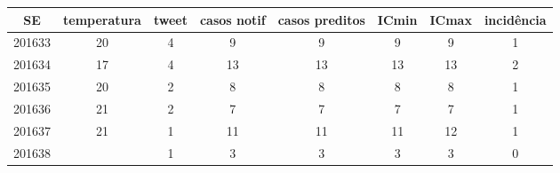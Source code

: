 \begin{tabular}{c|ccccccc}
  \hline
SE & temperatura & tweet & casos notif & casos preditos & ICmin & ICmax & incidência \\ 
  \hline
201633 & 20 & 4 & 9 & 9 & 9 & 9 & 1 \\ 
  201634 & 17 & 4 & 13 & 13 & 13 & 13 & 2 \\ 
  201635 & 20 & 2 & 8 & 8 & 8 & 8 & 1 \\ 
  201636 & 21 & 2 & 7 & 7 & 7 & 7 & 1 \\ 
  201637 & 21 & 1 & 11 & 11 & 11 & 12 & 1 \\ 
  201638 &  & 1 & 3 & 3 & 3 & 3 & 0 \\ 
   \hline
\end{tabular}
